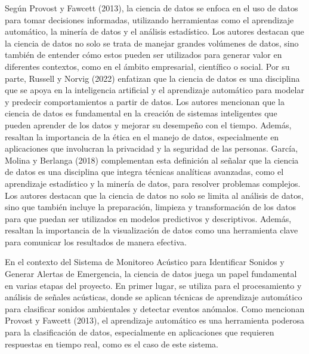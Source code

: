 
Según Provost y Fawcett (2013), la ciencia de datos se enfoca en el uso de datos para tomar decisiones informadas, utilizando herramientas como el aprendizaje automático, la minería de datos y el análisis estadístico. Los autores destacan que la ciencia de datos no solo se trata de manejar grandes volúmenes de datos, sino también de entender cómo estos pueden ser utilizados para generar valor en diferentes contextos, como en el ámbito empresarial, científico o social. Por su parte, Russell y Norvig (2022) enfatizan que la ciencia de datos es una disciplina que se apoya en la inteligencia artificial y el aprendizaje automático para modelar y predecir comportamientos a partir de datos. Los autores mencionan que la ciencia de datos es fundamental en la creación de sistemas inteligentes que pueden aprender de los datos y mejorar su desempeño con el tiempo. Además, resaltan la importancia de la ética en el manejo de datos, especialmente en aplicaciones que involucran la privacidad y la seguridad de las personas. García, Molina y Berlanga (2018) complementan esta definición al señalar que la ciencia de datos es una disciplina que integra técnicas analíticas avanzadas, como el aprendizaje estadístico y la minería de datos, para resolver problemas complejos. Los autores destacan que la ciencia de datos no solo se limita al análisis de datos, sino que también incluye la preparación, limpieza y transformación de los datos para que puedan ser utilizados en modelos predictivos y descriptivos. Además, resaltan la importancia de la visualización de datos como una herramienta clave para comunicar los resultados de manera efectiva.

En el contexto del Sistema de Monitoreo Acústico para Identificar Sonidos y Generar Alertas de Emergencia, la ciencia de datos juega un papel fundamental en varias etapas del proyecto. En primer lugar, se utiliza para el procesamiento y análisis de señales acústicas, donde se aplican técnicas de aprendizaje automático para clasificar sonidos ambientales y detectar eventos anómalos. Como mencionan Provost y Fawcett (2013), el aprendizaje automático es una herramienta poderosa para la clasificación de datos, especialmente en aplicaciones que requieren respuestas en tiempo real, como es el caso de este sistema.

